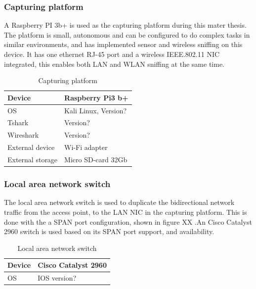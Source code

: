 \subsubsection{Capturing platform}
A Raspberry PI 3b+ is used as the capturing platform during this mater thesis. The platform is small, autonomous and can be configured to do complex tasks in similar environments, \cite{Raspberrypi3_as_a_platform} and \cite{Raspberrypi3_as_a_platform_1} has implemented sensor and wireless sniffing on this device. It has one ethernet RJ-45 port and a wireless IEEE.802.11 NIC integrated, this enables both LAN and WLAN sniffing at the same time. 

\begin{table}[!hbtp]
\centering
\caption{Capturing platform}
    \begin{tabular}{|l|l|}
    \hline
    Device           & Raspberry Pi3 b+     \\ \hline
    OS               & Kali Linux, Version? \\ \hline
    Tshark           & Version?             \\ \hline
    Wireshark        & Version?             \\ \hline
    External device  & Wi-Fi adapter        \\ \hline
    External storage & Micro SD-card 32Gb   \\ \hline
    \end{tabular}
\end{table}

\subsubsection{Local area network switch}
The local area network switch is used to duplicate the bidirectional network traffic from the access point, to the LAN NIC in the capturing platform.  This is done with the a SPAN port configuration, shown in figure XX \cite{Network_Span_port}.An Cisco Catalyst 2960 switch \cite{cisco_catalyst_8_port} is used based on its SPAN port support, and availability. 

\begin{table}[!hbtp]
\centering
\caption{Local area network switch}
    \begin{tabular}{|l|l|}
    \hline
        Device & Cisco Catalyst 2960 \\ \hline
        OS     & IOS version?        \\ \hline
    \end{tabular}
\end{table}

